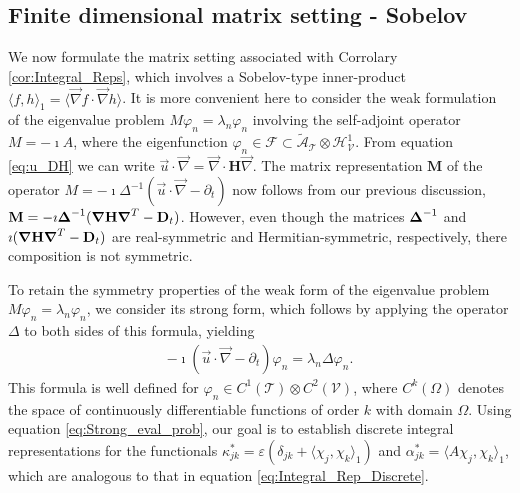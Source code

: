 \documentclass[11pt]{amsart}
\newcommand{\Mb}{\mathbf{M}}
\newcommand{\Hb}{\mathbf{H}}
\newcommand{\Db}{\mathbf{D}}
\newcommand{\Tc}{\mathcal{T}}
\newcommand{\Vc}{\mathcal{V}}
\newcommand{\Hc}{\mathcal{H}}
\newcommand{\Fc}{\mathcal{F}}
\newcommand{\As}{\mathscr{A}}
\newcommand\bDelta{\mbox{\boldmath${\Delta}$}}
\newcommand\Bnabla{\mbox{\boldmath${\nabla}$}}
\begin{document}
%
\subsection{Finite dimensional matrix setting - Sobelov}
\label{sec:Integral_Rep_Matrix_Sobelov}  
%
We now formulate the matrix setting associated with Corrolary
\ref{cor:Integral_Reps}, which involves a Sobelov-type inner-product 
$\langle f,h\rangle_1=\langle\vec{\nabla}f\cdot\vec{\nabla}h\rangle$. It is more convenient here to consider
the weak formulation of the eigenvalue problem $M\varphi_n=\lambda_n\varphi_n$
involving the self-adjoint operator $M=-\imath A$, where the eigenfunction
$\varphi_n\in\Fc\subset\tilde{\As}_{\Tc}\otimes\Hc^1_{\Vc}$. From equation \eqref{eq:u_DH}
we can write $\vec{u}\cdot\vec{\nabla}=\vec{\nabla}\cdot\Hb\vec{\nabla}$. The matrix
representation $\Mb$ of the operator $M=-\imath\Delta^{-1}(\vec{u}\cdot\vec{\nabla}-\partial_t)$
now follows from our previous discussion,
$\Mb=-\imath\bDelta^{-1}(\Bnabla\Hb\Bnabla^T-\Db_t)$. However, even though
the matrices $\bDelta^{-1}$ and $\imath(\Bnabla\Hb\Bnabla^T-\Db_t)$ are
real-symmetric and Hermitian-symmetric, respectively, there
composition is not symmetric. 




To retain the symmetry properties of the weak form of the eigenvalue 
problem $M\varphi_n=\lambda_n\varphi_n$, we consider its strong form, which follows by
applying the operator $\Delta$ to both sides of this formula, yielding  
%
\begin{align}\label{eq:Strong_eval_prob}
  -\imath(\vec{u}\cdot\vec{\nabla}-\partial_t)\varphi_n=\lambda_n\Delta\varphi_n.
\end{align}
%
This formula is well defined for $\varphi_n\in C^1(\Tc)\otimes C^2(\Vc)$, where $C^k(\Omega)$
denotes the space of continuously differentiable functions of order
$k$ with domain $\Omega$. Using equation \eqref{eq:Strong_eval_prob}, our
goal is to establish discrete integral representations for the functionals
$\kappa^*_{jk}=\varepsilon(\delta_{jk}+\langle\chi_j,\chi_k\rangle_1)$ and $\alpha^*_{jk}=\langle A\chi_j,\chi_k\rangle_1$, which
are analogous to that in equation
\eqref{eq:Integral_Rep_Discrete}. 
 
\end{document}
